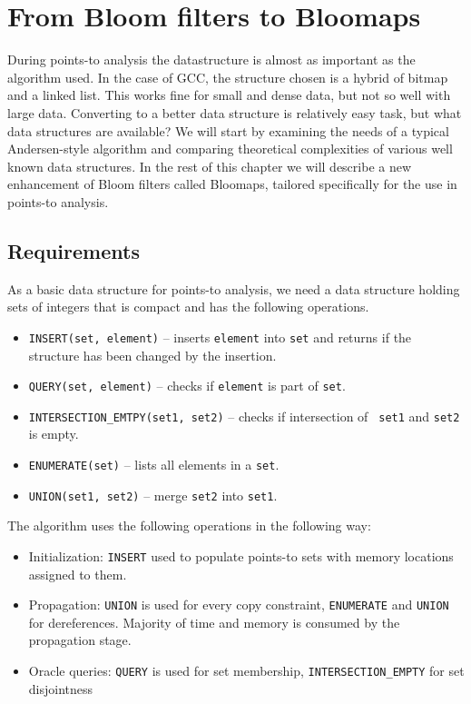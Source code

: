 \chapter{From Bloom filters to Bloomaps}
\label{chap-bloomaps}

During points-to analysis the datastructure is almost as important as the
algorithm used. In the case of GCC, the structure chosen is a hybrid of bitmap
and a linked list. This works fine for small and dense data, but not so well
with large data. Converting to a better data structure is relatively easy task, but what data
structures are available? We will start by examining the needs of a typical
Andersen-style algorithm and comparing theoretical complexities of various well
known data structures. In the rest of this chapter we will describe a new
enhancement of Bloom filters called Bloomaps, tailored specifically for the use
in points-to analysis.

\section{Requirements}

As a basic data structure for points-to analysis, we need a data structure holding sets of
integers that is compact and has the following operations.

\begin{itemize}
	\item {\tt INSERT(set, element)} -- inserts {\tt element} into {\tt set} and returns if
		the structure has been changed by the insertion.
	\item {\tt QUERY(set, element)} -- checks if {\tt element} is part of {\tt set}.
	\item {\tt INTERSECTION\_EMTPY(set1, set2)} -- checks if intersection of {\tt
		set1} and {\tt set2} is empty.
	\item {\tt ENUMERATE(set)} -- lists all elements in a {\tt set}.
	\item {\tt UNION(set1, set2)} -- merge {\tt set2} into {\tt set1}.
\end{itemize}

The algorithm uses the following operations in the following way:

\begin{itemize}
	\item Initialization: {\tt INSERT} used to populate points-to sets with
		memory locations assigned to them.
	\item Propagation: {\tt UNION} is used for every copy constraint, {\tt ENUMERATE} and
		{\tt UNION} for dereferences. Majority of time and memory is consumed by
		the propagation stage.
	\item Oracle queries: {\tt QUERY} is used for set membership, {\tt INTERSECTION\_EMPTY}
		for set disjointness
\end{itemize}


